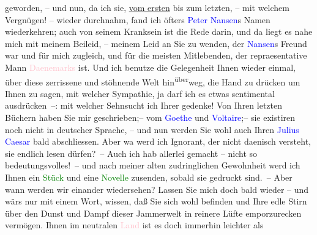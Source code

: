                     geworden, – und nun, da ich sie, \uline{vom ersten} bis
                    zum letzten,  – mit welchem Vergnügen! –
                    wieder durchnahm, fand ich öfters \textcolor{blue}{Peter
                        Nansen}{}\ledrightnote{\textcolor{blue}{Peter Nansen}}s Namen wiederkehren; auch von seinem Kranksein ist die Rede
                    darin, und da liegt es nahe mich mit meinem Beileid, – meinem Leid an Sie zu
                    wenden, der \textcolor{blue}{Nansen}{}\ledrightnote{\textcolor{blue}{Peter Nansen}}s Freund war und für mich
                    zugleich, und für die meisten Mitlebenden, {\pb}der repraesentative Mann \textcolor{pink}{Daenemarks}{}\ledrightnote{\textcolor{pink}{Dänemark}} ist. Und
                    ich benutze die Gelegenheit Ihnen wieder einmal, über diese zerrissene und
                    stöhnende Welt hin\substVorne{}\textsuperscript{über}\substDazwischen{}weg\substHinten{}, die Hand zu drücken um Ihnen zu sagen, mit welcher Sympathie, ja darf
                    ich es etwas sentimental ausdrücken –: mit welcher Sehnsucht ich Ihrer gedenke!
                    Von Ihren letzten Büchern haben Sie mir geschrieben;– vom \textcolor{green}{\textcolor{blue}{Goethe}{}\ledrightnote{\textcolor{blue}{Johann Wolfgang von Goethe}}}{} und \textcolor{green}{\textcolor{blue}{Voltaire}{}\ledrightnote{\textcolor{blue}{Voltaire}}}{};– sie existiren noch nicht in deutscher Sprache, – und nun werden Sie wohl
                    auch Ihren \textcolor{green}{\textcolor{blue}{Julius Caesar}{}\ledrightnote{\textcolor{blue}{Gaius Iulius Caesar}}}{} bald abschliessen. Aber wa{\geminationn} werd ich
                    Ignorant, der nicht daenisch versteht, sie endlich lesen dürfen? – Auch ich hab
                    allerlei gemacht – nicht so bedeutungsvolles! – und nach meiner alten
                    zudringlichen Gewohnheit werd ich Ihnen ein \textcolor{green}{Stück}{} und eine \textcolor{green}{Novelle}{} zusenden, sobald sie gedruckt sind. – Aber
                    wann werden wir einander wiedersehen? Lassen Sie mich doch bald wieder – und
                    wärs nur mit einem Wort, wissen, daß Sie sich wohl befinden und Ihre edle Stirn
                    über den Dunst und Dampf dieser Jammerwelt in {\pb}reinere Lüfte emporzurecken vermögen. Ihnen im neutralen \textcolor{pink}{Land}{} ist es doch immerhin leichter als
